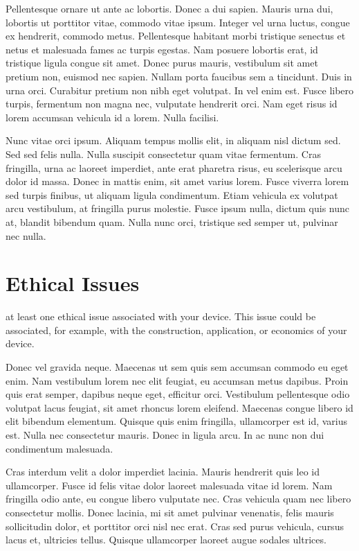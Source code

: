 \documentclass[twocolumn]{IEEEtran}
\begin{document}
Pellentesque ornare ut ante ac lobortis. Donec a dui sapien. Mauris urna dui, lobortis ut porttitor vitae, commodo vitae ipsum. Integer vel urna luctus, congue ex hendrerit, commodo metus. Pellentesque habitant morbi tristique senectus et netus et malesuada fames ac turpis egestas. Nam posuere lobortis erat, id tristique ligula congue sit amet. Donec purus mauris, vestibulum sit amet pretium non, euismod nec sapien. Nullam porta faucibus sem a tincidunt. Duis in urna orci. Curabitur pretium non nibh eget volutpat. In vel enim est. Fusce libero turpis, fermentum non magna nec, vulputate hendrerit orci. Nam eget risus id lorem accumsan vehicula id a lorem. Nulla facilisi.

Nunc vitae orci ipsum. Aliquam tempus mollis elit, in aliquam nisl dictum sed. Sed sed felis nulla. Nulla suscipit consectetur quam vitae fermentum. Cras fringilla, urna ac laoreet imperdiet, ante erat pharetra risus, eu scelerisque arcu dolor id massa. Donec in mattis enim, sit amet varius lorem. Fusce viverra lorem sed turpis finibus, ut aliquam ligula condimentum. Etiam vehicula ex volutpat arcu vestibulum, at fringilla purus molestie. Fusce ipsum nulla, dictum quis nunc at, blandit bibendum quam. Nulla nunc orci, tristique sed semper ut, pulvinar nec nulla.

\section{Ethical Issues}
 at least one ethical issue associated with your device. This issue could be associated, for example, with the construction, application, or economics of your device.

Donec vel gravida neque. Maecenas ut sem quis sem accumsan commodo eu eget enim. Nam vestibulum lorem nec elit feugiat, eu accumsan metus dapibus. Proin quis erat semper, dapibus neque eget, efficitur orci. Vestibulum pellentesque odio volutpat lacus feugiat, sit amet rhoncus lorem eleifend. Maecenas congue libero id elit bibendum elementum. Quisque quis enim fringilla, ullamcorper est id, varius est. Nulla nec consectetur mauris. Donec in ligula arcu. In ac nunc non dui condimentum malesuada.

Cras interdum velit a dolor imperdiet lacinia. Mauris hendrerit quis leo id ullamcorper. Fusce id felis vitae dolor laoreet malesuada vitae id lorem. Nam fringilla odio ante, eu congue libero vulputate nec. Cras vehicula quam nec libero consectetur mollis. Donec lacinia, mi sit amet pulvinar venenatis, felis mauris sollicitudin dolor, et porttitor orci nisl nec erat. Cras sed purus vehicula, cursus lacus et, ultricies tellus. Quisque ullamcorper laoreet augue sodales ultrices.
\end{document}
